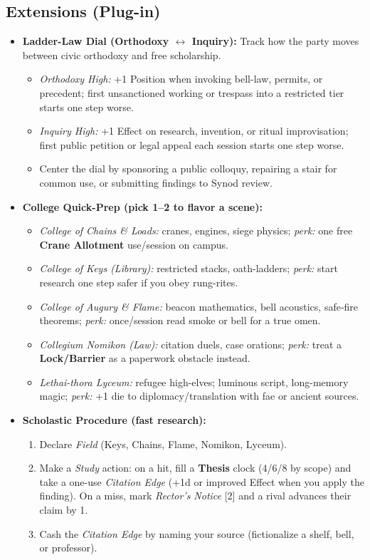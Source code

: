 \subsection*{Extensions (Plug-in)}
\label{sec:thepyrgos-extensions}
\begin{itemize}
  \item \textbf{Ladder-Law Dial (Orthodoxy \(\leftrightarrow\) Inquiry):} Track how the party moves between civic orthodoxy and free scholarship.
  \begin{itemize}
    \item \emph{Orthodoxy High:} +1 Position when invoking bell-law, permits, or precedent; first unsanctioned working or trespass into a restricted tier starts one step worse.
    \item \emph{Inquiry High:} +1 Effect on research, invention, or ritual improvisation; first public petition or legal appeal each session starts one step worse.
    \item Center the dial by sponsoring a public colloquy, repairing a stair for common use, or submitting findings to Synod review.
  \end{itemize}

  \item \textbf{College Quick-Prep (pick 1–2 to flavor a scene):}
  \begin{itemize}
    \item \emph{College of Chains \& Loads:} cranes, engines, siege physics; \emph{perk:} one free \textbf{Crane Allotment} use/session on campus.
    \item \emph{College of Keys (Library):} restricted stacks, oath-ladders; \emph{perk:} start research one step safer if you obey rung-rites.
    \item \emph{College of Augury \& Flame:} beacon mathematics, bell acoustics, safe‐fire theorems; \emph{perk:} once/session read smoke or bell for a true omen.
    \item \emph{Collegium Nomikon (Law):} citation duels, case orations; \emph{perk:} treat a \textbf{Lock/Barrier} as a paperwork obstacle instead.
    \item \emph{Lethai-thora Lyceum:} refugee high-elves; luminous script, long-memory magic; \emph{perk:} +1 die to diplomacy/translation with fae or ancient sources.
  \end{itemize}

  \item \textbf{Scholastic Procedure (fast research):}
  \begin{enumerate}
    \item Declare \emph{Field} (Keys, Chains, Flame, Nomikon, Lyceum).
    \item Make a \emph{Study} action: on a hit, fill a \textbf{Thesis} clock (4/6/8 by scope) and take a one-use \emph{Citation Edge} (+1d or improved Effect when you apply the finding). On a miss, mark \emph{Rector’s Notice} [2] and a rival advances their claim by 1.
    \item Cash the \emph{Citation Edge} by naming your source (fictionalize a shelf, bell, or professor).
  \end{enumerate}


\end{itemize}
